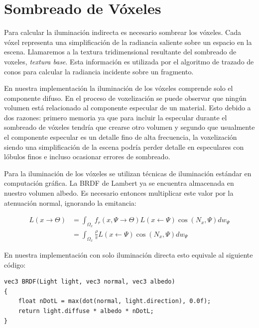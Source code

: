 \section{Sombreado de Vóxeles} %
\label{sec:sombreado_de_voxeles_impl}
Para calcular la iluminación indirecta es necesario sombrear los vóxeles. Cada vóxel representa una simplificación de la radiancia saliente sobre un espacio en la escena. Llamaremos a la textura tridimensional resultante del sombreado de voxeles, \emph{textura base}. Esta información es utilizada por el algoritmo de trazado de conos para calcular la radiancia incidente sobre un fragmento.

En nuestra implementación la iluminación de los vóxeles comprende solo el componente difuso. En el proceso de voxelización se puede observar que ningún volumen está relacionado al componente especular de un material. Esto debido a dos razones: primero memoria ya que para incluir la especular durante el sombreado de vóxeles tendría que crearse otro volumen y segundo que usualmente el componente especular es un detalle fino de alta frecuencia, la voxelización siendo una simplificación de la escena podría perder detalle en especulares con lóbulos finos e incluso ocasionar errores de sombreado.

Para la iluminación de los vóxeles se utilizan técnicas de iluminación estándar en computación gráfica. La \ac{BRDF} de Lambert ya se encuentra almacenada en nuestro volumen albedo. Es necesario entonces multiplicar este valor por la atenuación normal, ignorando la emitancia:

\begin{equation}
	\begin{split}
		L(x\to\Theta) &= \int_{\Omega_{x}}{f_{r}(x, \Psi\to\Theta)L(x\gets\Psi)\cos(N_{x}, \Psi)dw_{\Psi}}\\
		&= \int_{\Omega_{x}}{\frac{\rho}{\pi}L(x\gets\Psi)\cos(N_{x}, \Psi)dw_{\Psi}}
	\end{split}
	\label{eq:shading_voxels}
\end{equation}

En nuestra implementación con solo iluminación directa esto equivale al siguiente código:
\\
\begin{lstlisting}[caption={Sombreado estándar para un vóxel}, label=Shading]
vec3 BRDF(Light light, vec3 normal, vec3 albedo)
{
	float nDotL = max(dot(normal, light.direction), 0.0f);
	return light.diffuse * albedo * nDotL;
}
\end{lstlisting}

